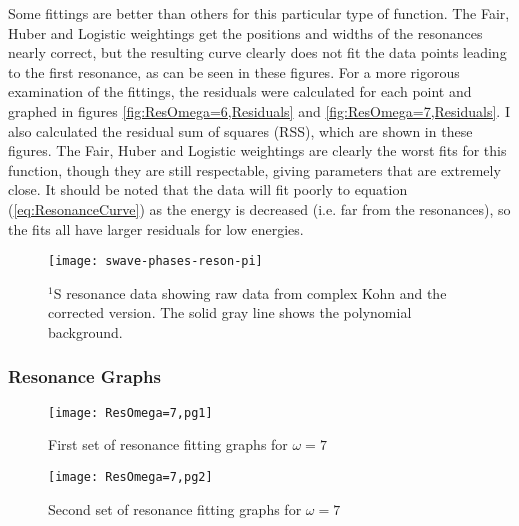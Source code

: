 \documentclass[Dissertation.tex]{subfiles}
\begin{document}
Some fittings are better than others for this particular type of function. The Fair, Huber and Logistic weightings get the positions and widths of the resonances nearly correct, but the resulting curve clearly does not fit the data points leading to the first resonance, as can be seen in these figures. For a more rigorous examination of the fittings, the residuals were calculated for each point and graphed in figures \ref{fig:ResOmega=6,Residuals} and \ref{fig:ResOmega=7,Residuals}. I also calculated the residual sum of squares (RSS), which are shown in these figures. The Fair, Huber and Logistic weightings are clearly the worst fits for this function, though they are still respectable, giving parameters that are extremely close. It should be noted that the data will fit poorly to equation (\ref{eq:ResonanceCurve}) as the energy is decreased (i.e. far from the resonances), so the fits all have larger residuals for low energies.


\begin{figure}[H]
	\centering
	\texttt{[image: swave-phases-reson-pi]}
	\caption[$^1$S resonance data showing correction]{$^1$S resonance data showing raw data from complex Kohn and the corrected version. The solid gray line shows the polynomial background.}
	\label{fig:swave-phases-reson-pi}
\end{figure}




\cite{Tennyson1984} \cite{Stibbe1998} \cite{Sochi2013}



\subsubsection{Resonance Graphs}
\label{sec:ResonanceGraphs}

\begin{figure}[H]
	\centering
	\texttt{[image: ResOmega=7,pg1]}
	\caption{First set of resonance fitting graphs for $\omega = 7$}
	\label{fig:ResOmega=7,pg1}
\end{figure}

\begin{figure}[H]
	\centering
	\texttt{[image: ResOmega=7,pg2]}
	\caption{Second set of resonance fitting graphs for $\omega = 7$}
	\label{fig:ResOmega=7,pg2}
\end{figure}
\end{document}
